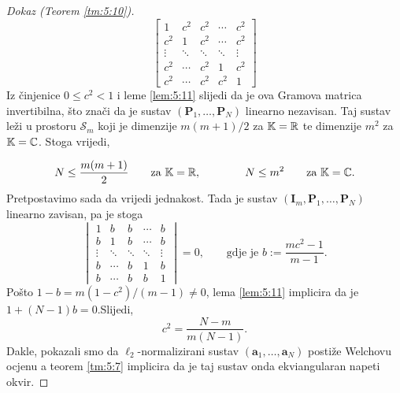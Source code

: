 \documentclass[a4paper,twoside,12pt]{memoir} %
\newcommand{\vect}[1]{\mathbf{#1}}
\renewcommand{\vec}{\vect}
\begin{document}
\begin{proof}[Dokaz (Teorem \ref{tm:5:10})]
    \begin{equation*}
        \begin{bmatrix*}
            1 & c^2 & c^2 & \cdots & c^2 \\
            c^2 & 1 & c^2 & \cdots & c^2 \\
            \vdots & \ddots & \ddots & \ddots & \vdots \\ 
            c^2 & \cdots & c^2 & 1 & c^2 \\
            c^2 & \cdots & c^2 & c^2 & 1 
        \end{bmatrix*}
    \end{equation*}
    Iz \v{c}injenice $0 \leq c^2 < 1$ i leme \ref{lem:5:11} slijedi da je ova Gramova matrica invertibilna, \v{s}to zna\v{c}i da je sustav $(\vec P_1, \dots, \vec P_N)$ linearno nezavisan. Taj sustav le\v{z}i u prostoru $\mathcal{S}_m$ koji je dimenzije $m(m+1)/2$ za $\mathbb{K} = \mathbb{R}$ te dimenzije $m^2$ za $\mathbb{K} = \mathbb{C}$. Stoga vrijedi,

    \begin{equation*}
        N \leq \frac{m(m+1)}{2} \quad \quad \text{za } \mathbb{K} = \mathbb{R},\quad \quad \quad \quad  N \leq m^2 \quad \quad \text{za } \mathbb{K} = \mathbb{C}.
    \end{equation*}
    Pretpostavimo sada da vrijedi jednakost. Tada je sustav $(\vec I_m, \vec P_1, \dots, \vec P_N)$ linearno zavisan, pa je stoga
    \begin{equation*}
        \begin{vmatrix*}
            1 & b & b & \cdots & b \\
            b & 1 & b & \cdots & b \\
            \vdots & \ddots & \ddots & \ddots & \vdots \\ 
            b & \cdots & b & 1 & b \\
            b & \cdots & b & b & 1 
        \end{vmatrix*} = 0, \quad \quad \text{gdje je } b:= \frac{mc^2 - 1}{m - 1}. 
    \end{equation*}
    Po\v{s}to $1-b = m(1-c^2)/(m-1) \neq 0$, lema \ref{lem:5:11} implicira da je $1+(N-1)b = 0$.Slijedi, 
    \begin{equation*}
        c^2 = \frac{N-m}{m(N-1)}.  
    \end{equation*}
    Dakle, pokazali smo da $\ell_2$-normalizirani sustav $(\vec a_1, \dots, \vec a_N)$ posti\v{z}e Welchovu ocjenu a teorem \ref{tm:5:7} implicira da je taj sustav onda ekviangularan napeti okvir.
\end{proof}
\end{document}
